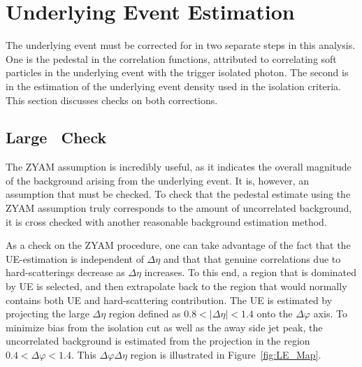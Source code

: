 \section{Underlying Event Estimation}
The underlying event must be corrected for in two separate steps in this analysis. One is the pedestal in the correlation functions, attributed to correlating soft particles in the underlying event with the trigger isolated photon. The second is in the estimation of the underlying event density used in the isolation criteria. This section discusses checks on both corrections.

\subsection{Large \deltaeta~Check}

The ZYAM assumption is incredibly useful, as it indicates the overall magnitude of the background arising from the underlying event. It is, however, an assumption that must be checked. To check that the pedestal estimate using the ZYAM assumption truly corresponds to the amount of uncorrelated background, it is cross checked with another reasonable background estimation method.


As a check on the ZYAM procedure, one can take advantage of the fact that the UE-estimation is independent of $\Delta\eta$ and that that genuine correlations due to hard-scatterings decrease as $\Delta\eta$ increases. To this end, a region that is dominated by UE is selected, and then extrapolate back to the region that would normally contains both UE and hard-scattering contribution. The UE is estimated by projecting the large $\Delta\eta$ region defined as $0.8 < |\Delta\eta| < 1.4$ onto the $\Delta\varphi$ axis. To minimize bias from the isolation cut as well as the away side jet peak, the uncorrelated background is estimated from the projection in the region $0.4 < \Delta\varphi < 1.4$. This $\Delta\varphi\Delta\eta$ region is illustrated in Figure~\ref{fig:LE_Map}. 

